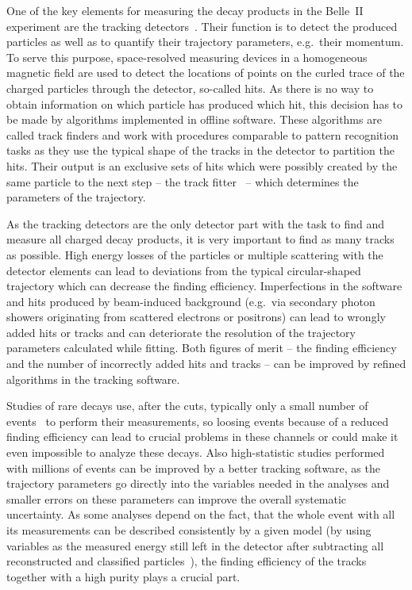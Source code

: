 
One of the key elements for measuring the decay products in the Belle~II experiment are the tracking detectors~\cite{tdr}. Their function is to detect the produced particles as well as to quantify their trajectory parameters, e.g.\ their momentum. To serve this purpose, space-resolved measuring devices in a homogeneous magnetic field are used to detect the locations of points on the curled trace of the charged particles through the detector, so-called hits. As there is no way to obtain information on which particle has produced which hit, this decision has to be made by algorithms implemented in offline software. These algorithms are called track finders and work with procedures comparable to pattern recognition tasks as they use the typical shape of the tracks in the detector to partition the hits. Their output is an exclusive sets of hits which were possibly created by the same particle to the next step -- the track fitter~\cite{genfit} -- which determines the parameters of the trajectory.

As the tracking detectors are the only detector part with the task to find and measure all charged decay products, it is very important to find as many tracks as possible. High energy losses of the particles or multiple scattering with the detector elements can lead to deviations from the typical circular-shaped trajectory which can decrease the finding efficiency. Imperfections in the software and hits produced by beam-induced background (e.g.\ via secondary photon showers originating from scattered electrons or positrons) can lead to wrongly added hits or tracks and can deteriorate the resolution of the trajectory parameters calculated while fitting. Both figures of merit -- the finding efficiency and the number of incorrectly added hits and tracks -- can be improved by refined algorithms in the tracking software.

Studies of rare decays use, after the cuts, typically only a small number of events~\cite{lutz} to perform their measurements, so loosing events because of a reduced finding efficiency can lead to crucial problems in these channels or could make it even impossible to analyze these decays. Also high-statistic studies performed with millions of events can be improved by a better tracking software, as the trajectory parameters go directly into the variables needed in the analyses and smaller errors on these parameters can improve the overall systematic uncertainty. As some analyses depend on the fact, that the whole event with all its measurements can be described consistently by a given model (by using variables as the measured energy still left in the detector after subtracting all reconstructed and classified particles~\cite{christian_phd}), the finding efficiency of the tracks together with a high purity plays a crucial part.


